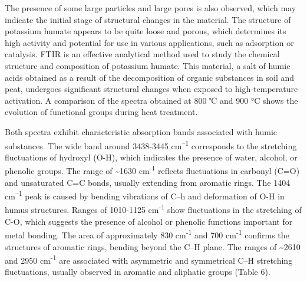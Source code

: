 \begin{multicols}{2}
The presence of some large particles and large pores is also observed,
which may indicate the initial stage of structural changes in the
material. The structure of potassium humate appears to be quite loose
and porous, which determines its high activity and potential for use in
various applications, such as adsorption or catalysis.
FTIR is an effective analytical method used to study the chemical
structure and composition of potassium humate. This material, a salt of
humic acids obtained as a result of the decomposition of organic
substances in soil and peat, undergoes significant structural changes
when exposed to high-temperature activation. A comparison of the spectra
obtained at 800 ℃ and 900 °C shows the evolution of functional groups
during heat treatment.

Both spectra exhibit characteristic absorption bands associated with
humic substances. The wide band around 3438-3445 cm\textsuperscript{--1}
corresponds to the stretching fluctuations of hydroxyl (O-H), which
indicates the presence of water, alcohol, or phenolic groups. The range
of \textasciitilde1630 cm\textsuperscript{-1} reflects fluctuations in
carbonyl (C=O) and unsaturated C=C bonds, usually extending from
aromatic rings. The 1404 cm\textsuperscript{--1} peak is caused by
bending vibrations of C--h and deformation of O-H in humus structures.
Ranges of 1010-1125 cm\textsuperscript{-1} show fluctuations in the
stretching of C-O, which suggests the presence of alcohol or phenolic
functions important for metal bonding. The area of approximately 830
cm\textsuperscript{-1} and 700 cm\textsuperscript{-1} confirms the
structures of aromatic rings, bending beyond the C--H plane. The ranges
of \textasciitilde2610 and 2950 cm\textsuperscript{-1} are associated
with asymmetric and symmetrical C--H stretching fluctuations, usually
observed in aromatic and aliphatic groups (Table 6).
\end{multicols}

